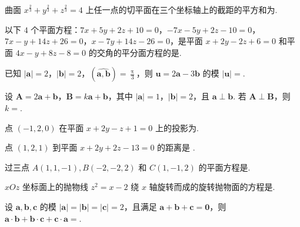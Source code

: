 	\begin{ti}
		曲面 $x^{\frac{2}{3}} + y^{\frac{2}{3}} + z^{\frac{2}{3}} = 4$ 上任一点的切平面在三个坐标轴上的截距的平方和为\kuo.

	\end{ti}

	\begin{ti}
		以下 $4$ 个平面方程：$7x + 5y + 2z + 10 = 0$，$-7x - 5y + 2z - 10 = 0$，$7x - y + 14z + 26 = 0$，$x - 7y + 14z - 26 = 0$，是平面 $x + 2y - 2z + 6 = 0$ 和平面 $4x - y + 8z - 8 = 0$ 的交角的平分面方程的是\kuo.

		\fourch{\circled{1}\circled{2}}{\circled{2}\circled{3}}{\circled{2}\circled{4}}{\circled{1}\circled{4}}
	\end{ti}

	\begin{ti}
		已知 $|\bm a| = 2$，$|\bm b| = 2$，$(\widehat{\bm a, \bm b}) = \frac{\uppi}{3}$，则 $\bm u = 2 \bm a - 3 \bm b$ 的模 $|\bm u| = $\htwo.
	\end{ti}

	\begin{ti}
		设 $\bm A = 2 \bm a + \bm b$，$\bm B = k \bm a + \bm b$，其中 $|\bm a| = 1$，$|\bm b| = 2$，且 $\bm a \perp \bm b$. 若 $\bm A \perp \bm B$，则 $k = $\htwo.
	\end{ti}

	\begin{ti}
		点 $(-1,2,0)$ 在平面 $x + 2y - z + 1 = 0$ 上的投影为\htwo.
	\end{ti}

	\begin{ti}
		点 $(1,2,1)$ 到平面 $x + 2y + 2z - 13 = 0$ 的距离是 \htwo.
	\end{ti}

	\begin{ti}
		过三点 $A(1,1,-1), B(-2,-2,2)$ 和 $C(1,-1,2)$ 的平面方程是\htwo.
	\end{ti}

	\begin{ti}
		$xOz$ 坐标面上的抛物线 $z^{2} = x - 2$ 绕 $x$ 轴旋转而成的旋转抛物面的方程是\htwo.
	\end{ti}

	\begin{ti}
		设 $\bm a, \bm b, \bm c$ 的模 $|\bm a| = |\bm b| = |\bm c| = 2$，且满足 $\bm a + \bm b + \bm c = \bm 0$，则 $\bm a \cdot \bm b + \bm b \cdot \bm c + \bm c \cdot \bm a = $\htwo.
	\end{ti}

